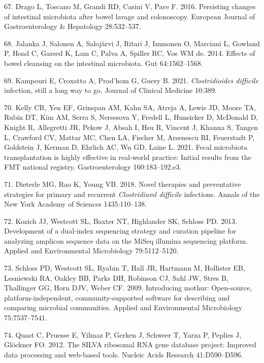 \documentclass[
  11pt,
]{article}
\begin{document}
\leavevmode\hypertarget{ref-Drago2016}{}%
67. Drago L, Toscano M, Grandi RD, Casini V, Pace F. 2016. Persisting
changes of intestinal microbiota after bowel lavage and colonoscopy.
European Journal of Gastroenterology \& Hepatology 28:532--537.

\leavevmode\hypertarget{ref-Jalanka2014}{}%
68. Jalanka J, Salonen A, Salojärvi J, Ritari J, Immonen O, Marciani L,
Gowland P, Hoad C, Garsed K, Lam C, Palva A, Spiller RC, Vos WM de.
2014. Effects of bowel cleansing on the intestinal microbiota. Gut
64:1562--1568.

\leavevmode\hypertarget{ref-Kampouri2021}{}%
69. Kampouri E, Croxatto A, Prod'hom G, Guery B. 2021.
\emph{Clostridioides difficile} infection, still a long way to go.
Journal of Clinical Medicine 10:389.

\leavevmode\hypertarget{ref-Kelly2021}{}%
70. Kelly CR, Yen EF, Grinspan AM, Kahn SA, Atreja A, Lewis JD, Moore
TA, Rubin DT, Kim AM, Serra S, Nersesova Y, Fredell L, Hunsicker D,
McDonald D, Knight R, Allegretti JR, Pekow J, Absah I, Hsu R, Vincent J,
Khanna S, Tangen L, Crawford CV, Mattar MC, Chen LA, Fischer M,
Arsenescu RI, Feuerstadt P, Goldstein J, Kerman D, Ehrlich AC, Wu GD,
Laine L. 2021. Fecal microbiota transplantation is highly effective in
real-world practice: Initial results from the FMT national registry.
Gastroenterology 160:183--192.e3.

\leavevmode\hypertarget{ref-Dieterle2018}{}%
71. Dieterle MG, Rao K, Young VB. 2018. Novel therapies and preventative
strategies for primary and recurrent \emph{Clostridiuml difficile}
infections. Annals of the New York Academy of Sciences 1435:110--138.

\leavevmode\hypertarget{ref-Kozich2013}{}%
72. Kozich JJ, Westcott SL, Baxter NT, Highlander SK, Schloss PD. 2013.
Development of a dual-index sequencing strategy and curation pipeline
for analyzing amplicon sequence data on the MiSeq illumina sequencing
platform. Applied and Environmental Microbiology 79:5112--5120.

\leavevmode\hypertarget{ref-Schloss2009}{}%
73. Schloss PD, Westcott SL, Ryabin T, Hall JR, Hartmann M, Hollister
EB, Lesniewski RA, Oakley BB, Parks DH, Robinson CJ, Sahl JW, Stres B,
Thallinger GG, Horn DJV, Weber CF. 2009. Introducing mothur:
Open-source, platform-independent, community-supported software for
describing and comparing microbial communities. Applied and
Environmental Microbiology 75:7537--7541.

\leavevmode\hypertarget{ref-Quast2012}{}%
74. Quast C, Pruesse E, Yilmaz P, Gerken J, Schweer T, Yarza P, Peplies
J, Glöckner FO. 2012. The SILVA ribosomal RNA gene database project:
Improved data processing and web-based tools. Nucleic Acids Research
41:D590--D596.
\end{document}
